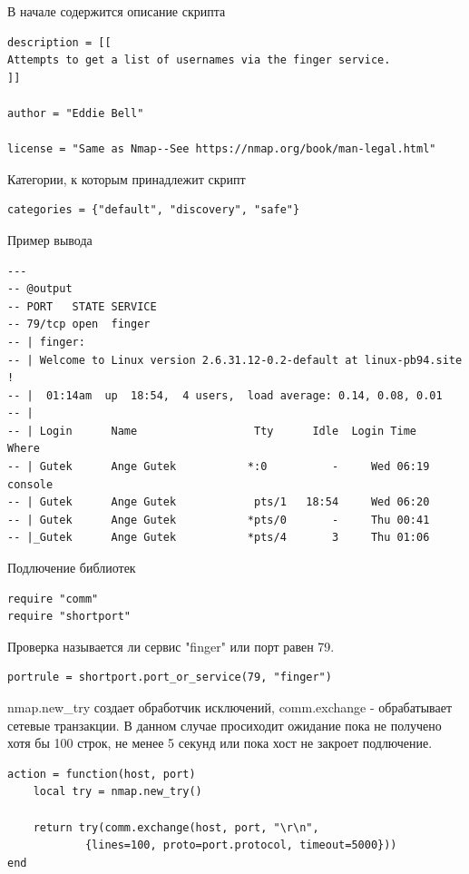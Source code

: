 \documentclass[10pt,a4paper]{article}
\begin{document}
В начале содержится описание скрипта

\begin{verbatim}
description = [[
Attempts to get a list of usernames via the finger service.
]]

author = "Eddie Bell"

license = "Same as Nmap--See https://nmap.org/book/man-legal.html"
\end{verbatim}

Категории, к которым принадлежит скрипт

\begin{verbatim}
categories = {"default", "discovery", "safe"}
\end{verbatim}

Пример вывода

\begin{verbatim}
---
-- @output
-- PORT   STATE SERVICE
-- 79/tcp open  finger
-- | finger:
-- | Welcome to Linux version 2.6.31.12-0.2-default at linux-pb94.site !
-- |  01:14am  up  18:54,  4 users,  load average: 0.14, 0.08, 0.01
-- |
-- | Login      Name                  Tty      Idle  Login Time   Where
-- | Gutek      Ange Gutek           *:0          -     Wed 06:19 console
-- | Gutek      Ange Gutek            pts/1   18:54     Wed 06:20
-- | Gutek      Ange Gutek           *pts/0       -     Thu 00:41
-- |_Gutek      Ange Gutek           *pts/4       3     Thu 01:06
\end{verbatim}

Подлючение библиотек

\begin{verbatim}
require "comm"
require "shortport"
\end{verbatim}

Проверка называется ли сервис "finger" или порт равен 79. 
\begin{verbatim}
portrule = shortport.port_or_service(79, "finger")
\end{verbatim}

nmap.new\_try создает обработчик исключений, comm.exchange - обрабатывает сетевые транзакции. В данном случае просиходит ожидание пока не получено хотя бы 100 строк, не менее 5 секунд или пока хост не закроет подлючение.

\begin{verbatim}
action = function(host, port)
	local try = nmap.new_try()

	return try(comm.exchange(host, port, "\r\n",
        	{lines=100, proto=port.protocol, timeout=5000}))
end
\end{verbatim}


\end{document}
